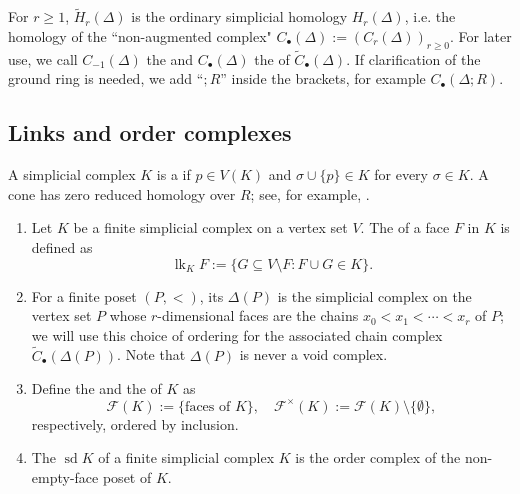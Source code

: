\documentclass[a4paper,leqno]{amsart}
\begin{document}
For $r\geq1$, $\widetilde H_r(\Delta)$ is the ordinary simplicial homology $H_r(\Delta)$, i.e. the homology of the ``non-augmented complex" $C_\bullet(\Delta):=(C_r(\Delta))_{r\geq0}$.
For later use, we call $C_{-1}(\Delta)$ the  and $C_\bullet(\Delta)$ the  of $\widetilde C_\bullet(\Delta)$. 
If clarification of the ground ring is needed, we add ``$;R$'' inside the brackets, for example $C_\bullet(\Delta;R)$. 


\subsection{Links and order complexes}
\label{subsec:topological-tools}

A simplicial complex $K$ is a  if $p\in V(K)$ and $\sigma\cup\{p\}\in K$ for every $\sigma\in K$. A cone has zero reduced homology over $R$; see, for example, \cite[Theorem~8.2]{Mun84}.

\begin{dfn}\label{def:link,face poset,sd}
\begin{enumerate}
    \item Let $K$ be a finite simplicial complex on a vertex set $V$.  The  of a face $F$ in $K$ is defined as
\[
\operatorname{lk}_K F:=\{G\subseteq V\setminus F:F\cup G\in K\}.
\]

    \item 
For a finite poset $(P,<)$, its  $\Delta(P)$ is the simplicial complex on the vertex set $P$ whose $r$-dimensional faces are the chains $x_0<x_1<\cdots<x_r$ of $P$; we will use this choice of ordering for the associated chain complex $\widetilde{C}_\bullet(\Delta(P))$.  Note that $\Delta(P)$ is never a void complex.

\item Define the  and the  of $K$ as
\[
\mathcal F(K):=\{\text{faces of }K\}, \quad \mathcal{F}^\times(K):=\mathcal{F}(K)\setminus\{\emptyset\},
\]
respectively, ordered by inclusion.

\item The  $\operatorname{sd}K$ of a finite simplicial complex $K$ is the order complex of the non-empty-face poset of $K$.
\end{enumerate}
\end{dfn}
\end{document}
